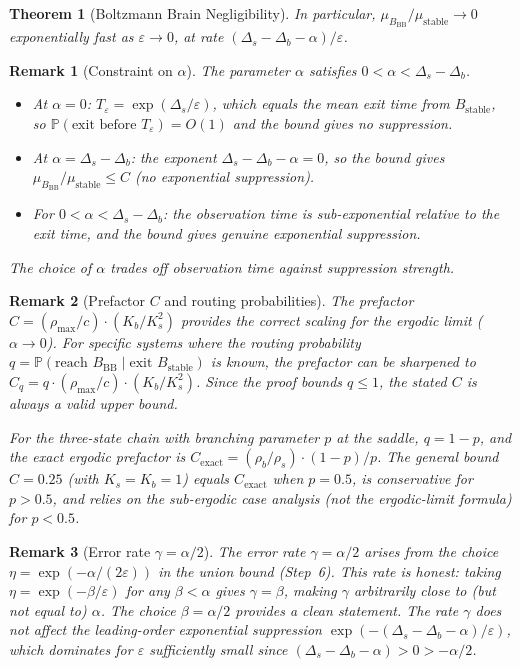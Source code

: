 \documentclass[11pt]{article}
\newtheorem{theorem}{Theorem}
\newtheorem{remark}{Remark}
\newcommand{\eps}{\varepsilon}
\newcommand{\Ds}{\Delta_s}
\newcommand{\Db}{\Delta_b}
\newcommand{\Bstable}{B_{\mathrm{stable}}}
\newcommand{\BBB}{B_{\mathrm{BB}}}
\newcommand{\Teps}{T_\eps}
\begin{document}
\begin{theorem}[Boltzmann Brain Negligibility]
In particular, $\mu_\BBB / \mu_{\mathrm{stable}} \to 0$
exponentially fast as $\eps \to 0$, at rate
$(\Ds - \Db - \alpha)/\eps$.
\end{theorem}

\begin{remark}[Constraint on $\alpha$]
The parameter $\alpha$ satisfies $0 < \alpha < \Ds - \Db$.
\begin{itemize}
\item At $\alpha = 0$: $\Teps = \exp(\Ds/\eps)$, which equals the
  mean exit time from $\Bstable$, so $\mathbb{P}(\text{exit before }
  \Teps) = O(1)$ and the bound gives no suppression.
\item At $\alpha = \Ds - \Db$: the exponent $\Ds - \Db - \alpha = 0$,
  so the bound gives $\mu_\BBB/\mu_{\mathrm{stable}} \leq C$
  (no exponential suppression).
\item For $0 < \alpha < \Ds - \Db$: the observation time is
  sub-exponential relative to the exit time, and the bound gives
  genuine exponential suppression.
\end{itemize}
The choice of $\alpha$ trades off observation time against
suppression strength.
\end{remark}

\begin{remark}[Prefactor $C$ and routing probabilities]\label{rem:routing}
The prefactor $C = (\rho_{\max}/c) \cdot (K_b/K_s^2)$ provides
the correct scaling for the ergodic limit ($\alpha \to 0$).
For specific systems where the routing probability
$q = \mathbb{P}(\text{reach } \BBB \mid \text{exit } \Bstable)$
is known, the prefactor can be sharpened to
$C_q = q \cdot (\rho_{\max}/c) \cdot (K_b/K_s^2)$.
Since the proof bounds $q \leq 1$, the stated $C$ is always
a valid upper bound.

For the three-state chain with branching parameter $p$ at the
saddle, $q = 1-p$, and the exact ergodic prefactor is
$C_{\mathrm{exact}} = (\rho_b/\rho_s) \cdot (1-p)/p$.
The general bound $C = 0.25$ (with $K_s = K_b = 1$) equals
$C_{\mathrm{exact}}$ when $p = 0.5$, is conservative for $p > 0.5$,
and relies on the sub-ergodic case analysis (not the ergodic-limit
formula) for $p < 0.5$.
\end{remark}

\begin{remark}[Error rate $\gamma = \alpha/2$]\label{rem:gamma}
The error rate $\gamma = \alpha/2$ arises from the choice
$\eta = \exp(-\alpha/(2\eps))$ in the union bound (Step~6).
This rate is honest: taking $\eta = \exp(-\beta/\eps)$ for any
$\beta < \alpha$ gives $\gamma = \beta$, making $\gamma$
arbitrarily close to (but not equal to) $\alpha$. The choice
$\beta = \alpha/2$ provides a clean statement. The rate $\gamma$
does not affect the leading-order exponential suppression
$\exp(-(\Ds - \Db - \alpha)/\eps)$, which dominates for
$\eps$ sufficiently small since
$(\Ds - \Db - \alpha) > 0 > -\alpha/2$.
\end{remark}
\end{document}
